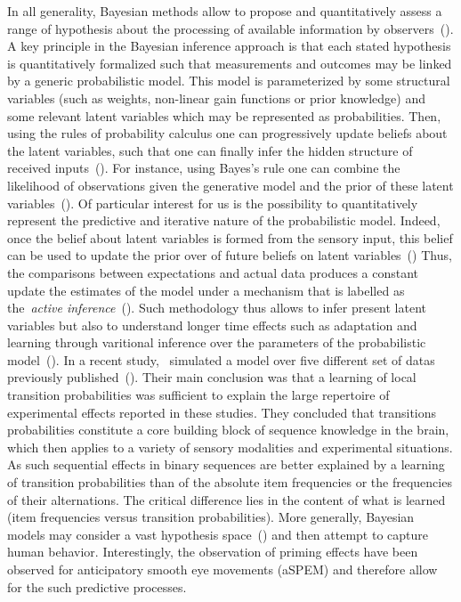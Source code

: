 \documentclass[profile,final,english, draft]{article}%
\newcommand{\citep}[1]{(\cite{#1})}
\begin{document}
In all generality, Bayesian methods allow to propose and quantitatively assess
a range of hypothesis about the processing
of available information by observers~\citep{Deneve1999, Diaconescu2014, Deaunizau}.
A key principle in the Bayesian inference approach is
that each stated hypothesis is quantitatively formalized
such that measurements and outcomes may be linked by
a generic probabilistic model. %
This model is parameterized by some structural variables
(such as weights, non-linear gain functions or prior knowledge)
and some relevant latent variables
which may be represented as probabilities.
Then, using the rules of probability calculus
one can progressively update beliefs about the latent variables,
such that one can finally infer the hidden structure of received inputs~\citep{Hoyer2003, Ma2014}.
For instance, using Bayes's rule one can combine
the likelihood of observations given the generative model and
the prior of these latent variables~\citep{Janes2014}.
Of particular interest for us is the possibility to
quantitatively represent
the predictive and iterative nature of the probabilistic model.
Indeed, once the belief about latent variables
is formed from the sensory input,
this belief can be used to update
the prior over of future beliefs on latent variables~\citep{Montagnini2007}
Thus, the comparisons between expectations and actual data produces
a constant update the estimates of the model under a mechanism
that is labelled as the~\textit{active inference}~\citep{Friston2003, Friston2010}.
Such methodology thus allows to infer present latent variables
but also to understand longer time effects such as adaptation and learning
through varitional inference over
the parameters of the probabilistic model~\citep{ref}.
In a recent study,~\citet{Meyniel2016} simulated
a model over five different set of datas
previously published~\citep{Squires1976, Huettel2002, Kolossa2013, Cho2002, Falk1997}.
Their main conclusion was that
a learning of local transition probabilities
was sufficient to explain the large repertoire
of experimental effects reported in these studies.
They concluded that transitions probabilities constitute
a core building block of sequence knowledge in the brain,
which then applies to a variety of sensory modalities and
experimental situations.
As such sequential effects in binary sequences are better explained
by a learning of transition probabilities
than of the absolute item frequencies or the frequencies of their alternations.
The critical difference lies in the content
of what is learned (item frequencies versus transition probabilities).
More generally, Bayesian models may consider
a vast hypothesis space~\citep{Kemp2008} and
then attempt to capture human behavior.
Interestingly, the observation of priming effects
have been observed for anticipatory smooth eye movements (aSPEM)
and therefore allow for the such predictive processes. %
\end{document}
